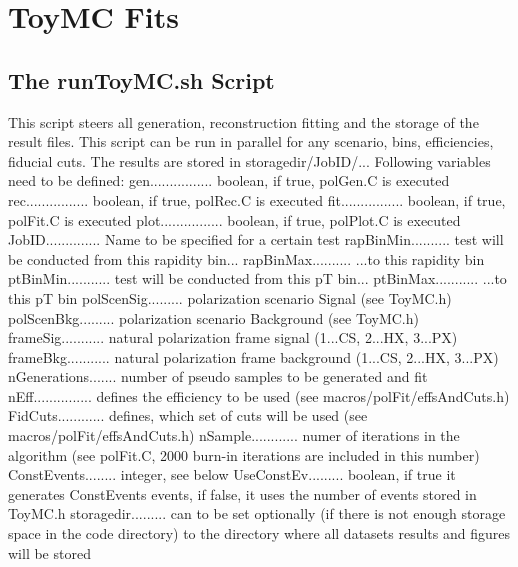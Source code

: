 \documentclass{article}
\begin{document}
\section{ToyMC Fits}

\subsection{The runToyMC.sh Script}

This script steers all generation, reconstruction fitting and the storage of the result
files. This script can be run in parallel for any scenario, bins, efficiencies, fiducial
cuts. The results are stored in storagedir/JobID/...
Following variables need to be defined:
\newline gen................ boolean, if true, polGen.C is executed
\newline rec................ boolean, if true, polRec.C is executed
\newline fit................ boolean, if true, polFit.C is executed
\newline plot................ boolean, if true, polPlot.C is executed
\newline JobID.............. Name to be specified for a certain test
\newline rapBinMin.......... test will be conducted from this rapidity bin...
\newline rapBinMax.......... ...to this rapidity bin
\newline ptBinMin........... test will be conducted from this pT bin...
\newline ptBinMax........... ...to this pT bin
\newline polScenSig......... polarization scenario Signal (see ToyMC.h)
\newline polScenBkg......... polarization scenario Background (see ToyMC.h)
\newline frameSig........... natural polarization frame signal (1...CS, 2...HX, 3...PX)
\newline frameBkg........... natural polarization frame background (1...CS, 2...HX, 3...PX)
\newline nGenerations....... number of pseudo samples to be generated and fit
\newline nEff............... defines the efficiency to be used (see macros/polFit/effsAndCuts.h)
\newline FidCuts............ defines, which set of cuts will be used (see macros/polFit/effsAndCuts.h)
\newline nSample............ numer of iterations in the algorithm (see polFit.C, 2000 burn-in iterations are included in this number)
\newline ConstEvents........ integer, see below
\newline UseConstEv......... boolean, if true it generates ConstEvents events, if false, it uses the number of events
stored in ToyMC.h
\newline storagedir......... can to be set optionally (if there is not enough storage space in the code directory) to the directory where all datasets results and figures will be stored
\end{document}
